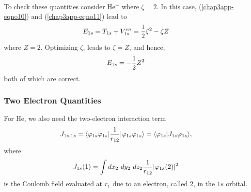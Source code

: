 To check these quantities consider He$^+$ where $\zeta = 2$. In this
case, (\ref{chap3app-eqno10}) and (\ref{chap3app-eqno11}) lead to
\begin{equation}
E_{1s} = T_{1s} + V^{en}_{1s} = {1 \over 2} \zeta^2 - \zeta Z
\end{equation}
where $Z = 2$.  Optimizing $\zeta$, leads to $\zeta = Z$, and hence,
\begin{equation}
E_{1s} = - {1 \over 2} Z^2
\end{equation}
both of which are correct.

\subsubsection{Two Electron Quantities}

For He, we also need the two-electron interaction term
\begin{equation}
J_{1s , 1s} = \langle \varphi_{1s} \varphi_{1s} \vert {1 \over r_{12}} 
\vert \varphi_{1s} \varphi_{1s} \rangle = \langle \varphi_{1s} \vert J_{1s} 
\varphi_{1s} \rangle ,
\label{chap3app-eqno12}
\end{equation}
where
\begin{equation}
J_{1s} (1) = \int dx_2\ dy_2\ dz_2 {1 \over r_{12}} \vert \varphi_{1s} (2) 
\vert^2
\label{chap3app-eqno13}
\end{equation}
is the Coulomb field evaluated at $r_1$ due to an electron, called 2, in the 
$1s$ orbital.


